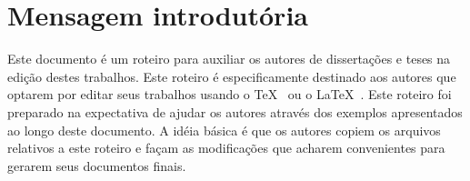\section{Mensagem introdutória}
Este documento é um roteiro para auxiliar os autores de
dissertações e teses na edição destes trabalhos.
Este roteiro é especificamente destinado aos autores que optarem
por editar seus trabalhos usando o \TeX\ \cite{knuth:tex,texbook} ou o \LaTeX\ \cite{lamport:latex,latexbook}.
Este roteiro foi preparado na expectativa de ajudar os autores
através dos exemplos apresentados ao longo deste documento. A
idéia básica é que os autores copiem os arquivos
relativos a este roteiro e façam as modificações que
acharem convenientes para gerarem seus documentos finais.

